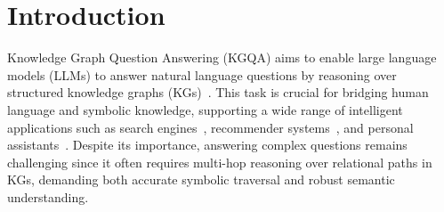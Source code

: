 \section{Introduction}

Knowledge Graph Question Answering (KGQA) aims to enable large language models (LLMs) to answer natural language questions by reasoning over structured knowledge graphs (KGs)~\cite{choi2023nutrea,saxena2020improving}. This task is crucial for bridging human language and symbolic knowledge, supporting a wide range of intelligent applications such as search engines~\cite{Zhao2020BrainInspiredSE,Kejriwal2017KnowledgeGF}, recommender systems~\cite{Wang2019KnowledgeGC,Guo2020ASO}, and personal assistants~\cite{Balog2019PersonalKG,Liu2024AQA,fang2025comprehensive}. Despite its importance, answering complex questions remains challenging since it often requires multi-hop reasoning over relational paths in KGs, demanding both accurate symbolic traversal and robust semantic understanding. 


